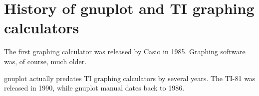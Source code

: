 \documentclass[11pt,letterpaper]{report}
\begin{document}
\chapter{History of gnuplot and TI graphing calculators}

The first graphing calculator was released by Casio in 1985. Graphing software was, of course, much older. 

gnuplot actually predates TI graphing calculators by several years.
The TI-81 was released in 1990, while gnuplot manual dates back to 1986.



\end{document}
